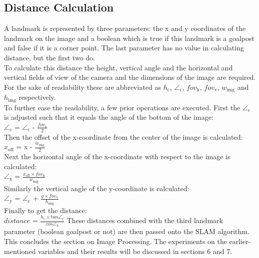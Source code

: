 \documentclass{ba-kecs}
\numberwithin{figure}{section}
\numberwithin{equation}{section}
\begin{document}
\subsection{Distance Calculation}
A landmark is represented by three parameters: the x and y coordinates of the landmark on the image and a boolean which is true if this landmark is a goalpost and false if it is a corner point. The last parameter has no value in calculating distance, but the first two do.\\
To calculate this distance the height, vertical angle and the horizontal and vertical fields of view of the camera and the dimensions of the image are required. For the sake of readability these are abbreviated as $h_{\mathrm{c}}$, $\angle_{\mathrm{c}}$, $fov_{\mathrm{h}}$, $fov_{\mathrm{v}}$, $w_{\mathrm{img}}$ and $h_{\mathrm{img}}$ respectively. \\
To further ease the readability, a few prior operations are executed.
First the $\angle_{\mathrm{c}}$ is adjusted such that it equals the angle of the bottom of the image:\\
$\angle_{\mathrm{c}}$ = $\angle_{\mathrm{c}}$ - $\frac{fov_{\mathrm{v}}}{2}$ \\
Then the offset of the x-coordinate from the center of the image is calculated: \\
$x_{\mathrm{off}}$ = x - $\frac{w_{\mathrm{img}}}{2}$ \\
Next the horizontal angle of the x-coordinate with respect to the image is calculated: \\
$\angle_{\mathrm{x}}$ = $\frac{x_{\mathrm{off}} \times fov_{\mathrm{h}}}{w_{\mathrm{img}}}$ \\
Similarly the vertical angle of the y-coordinate is calculated: \\
$\angle_{\mathrm{y}}$ = $\angle_{\mathrm{c}}$ + $\frac{y \times fov_{\mathrm{v}}}{h_{\mathrm{img}}}$ \\
Finally to get the distance: \\
$\textit{distance}$ = $\frac{h_{\mathrm{c}} \times \textit{tan} \angle_{\mathrm{y}}}{\textit{cos} \angle_{\mathrm{x}}}$
These distances combined with the third landmark parameter (boolean goalpost or not) are then passed onto the SLAM algorithm. \\
This concludes the section on Image Processing. The experiments on the earlier-mentioned variables and their results will be discussed in sections 6 and 7. 

\end{document}
